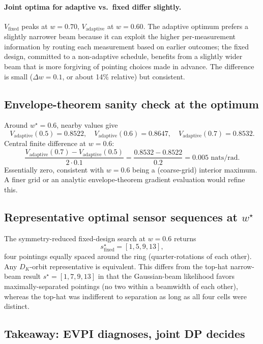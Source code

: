 \documentclass[11pt,a4paper]{article}
\begin{document}
\paragraph{Joint optima for adaptive vs.\ fixed differ slightly.}  $V_{\text{fixed}}$ peaks at $w = 0.70$, $V_{\text{adaptive}}$ at $w = 0.60$.  The adaptive optimum prefers a slightly narrower beam because it can exploit the higher per-measurement information by routing each measurement based on earlier outcomes; the fixed design, committed to a non-adaptive schedule, benefits from a slightly wider beam that is more forgiving of pointing choices made in advance.  The difference is small ($\Delta w = 0.1$, or about 14\% relative) but consistent.

\subsection{Envelope-theorem sanity check at the optimum}

Around $w^\star = 0.6$, nearby values give
\[
  V_{\text{adaptive}}(0.5) = 0.8522, \quad
  V_{\text{adaptive}}(0.6) = 0.8647, \quad
  V_{\text{adaptive}}(0.7) = 0.8532.
\]
Central finite difference at $w = 0.6$:
\[
  \frac{V_{\text{adaptive}}(0.7) - V_{\text{adaptive}}(0.5)}{2 \cdot 0.1}
  = \frac{0.8532 - 0.8522}{0.2} = 0.005 \text{ nats/rad}.
\]
Essentially zero, consistent with $w = 0.6$ being a (coarse-grid) interior maximum.  A finer grid or an analytic envelope-theorem gradient evaluation would refine this.

\subsection{Representative optimal sensor sequences at $w^\star$}

The symmetry-reduced fixed-design search at $w = 0.6$ returns
\[
  s^\star_{\text{fixed}} = [1, 5, 9, 13],
\]
four pointings equally spaced around the ring (quarter-rotations of each other).  Any $D_K$-orbit representative is equivalent.  This differs from the top-hat narrow-beam result $s^\star = [1, 7, 9, 13]$ in that the Gaussian-beam likelihood favors maximally-separated pointings (no two within a beamwidth of each other), whereas the top-hat was indifferent to separation as long as all four cells were distinct.

\subsection{Takeaway: EVPI diagnoses, joint DP decides}
\label{subsec:takeaway}
\end{document}
